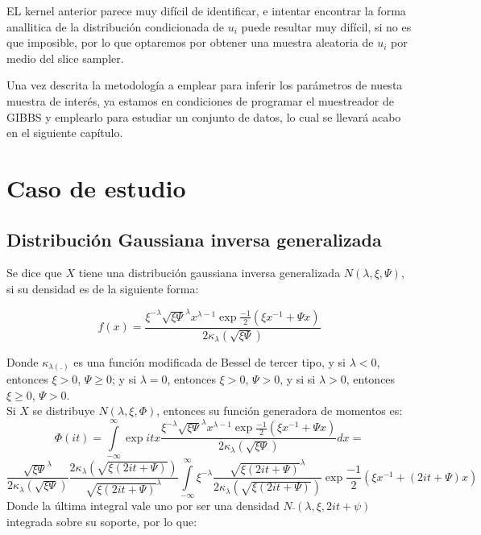 \documentclass[11pt]{book}
\begin{document}
EL kernel anterior parece muy difícil de identificar, e intentar encontrar la forma anallitica de la distribución condicionada de $u_{i}$ puede resultar muy difícil, si no es que imposible, por lo que optaremos por obtener una muestra aleatoria de $u_{i}$ por medio del slice sampler.

Una vez descrita la metodología a emplear para inferir los parámetros de nuesta muestra de interés, ya estamos en condiciones de programar el muestreador de GIBBS y emplearlo para estudiar un conjunto de datos, lo cual se llevará acabo en el siguiente capítulo.

\chapter*{Caso de estudio}



\section*{Distribución Gaussiana inversa generalizada}
Se dice que $X$ tiene una distribución gaussiana inversa generalizada $N\tilde{}(\lambda,\xi,\Psi)$, si su densidad es de la siguiente forma:

\begin{equation*}
f(x)= \dfrac{\xi^{-\lambda}\sqrt{\xi\Psi}^{\lambda}x^{\lambda-1}\exp{\frac{-1}{2}(\xi x^{-1} + \Psi x)}}{2\kappa_{\lambda}(\sqrt{\xi\Psi})}  
\end{equation*}

Donde $\kappa_{\lambda(.)}$ es una función modificada de Bessel de tercer tipo, y si $\lambda<0$, entonces $\xi>0$, $\Psi \ge 0 $; y si $\lambda=0$, entonces $\xi>0$, $\Psi > 0 $, y si si $\lambda>0$, entonces $\xi\ge 0$, $\Psi > 0 $.\\

Si $X$ se distribuye $N\tilde{}(\lambda,\xi,\Phi)$, entonces su función generadora de momentos es:
\begin{equation*}
\Phi (it)=\underset{-\infty }{\overset{\infty }{\int }}\exp{itx}\dfrac{\xi^{-\lambda}\sqrt{\xi\Psi}^{\lambda}x^{\lambda-1}\exp{\frac{-1}{2}(\xi x^{-1} + \Psi x)}}{2\kappa_{\lambda}(\sqrt{\xi\Psi})}dx=
\end{equation*}
\begin{equation*}
\frac{\sqrt{\xi\Psi}^{\lambda}}{2\kappa_{\lambda}(\sqrt{\xi\Psi})}\frac{2\kappa_{\lambda}(\sqrt{\xi(2it + \Psi)})}{\sqrt{\xi(2it + \Psi)}^{\lambda}}\underset{-\infty }{\overset{\infty }{\int }}\xi^{-\lambda}\frac{\sqrt{\xi(2it + \Psi)}^{\lambda}}{2\kappa_{\lambda}(\sqrt{\xi(2it + \Psi)})}\exp{\frac{-1}{2}(\xi x^{-1} + (2it+\Psi) x)}
\end{equation*}
Donde la última integral vale uno por ser una densidad $N\bar{}(\lambda,\xi,2it + \psi)$ integrada sobre su soporte, por lo que:
\end{document}

